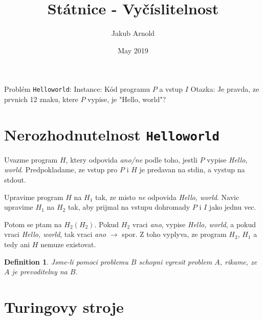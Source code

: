 \documentclass{article}
\title{Státnice - Vyčíslitelnost}
\author{Jakub Arnold}
\date{May 2019}
\newcommand{\inlinecode}{\texttt}
\theoremstyle{plain}
\theoremstyle{plain}
\newtheorem{defn}{Definition}
\theoremstyle{remark}
\begin{document}
\maketitle

Problém \inlinecode{Helloworld}:
Instance: Kód programu $P$ a vstup $I$
Otazka: Je pravda, ze prvnich 12 znaku, ktere $P$ vypise, je "Hello, world"?

\section{Nerozhodnutelnost \inlinecode{Helloworld}}

Uvazme program $H$, ktery odpovida \emph{ano/ne} podle toho, jestli $P$ vypise \emph{Hello, world}. Predpokladame, ze vstup pro $P$ i $H$ je predavan na stdin, a vystup na stdout.

Upravime program $H$ na $H_1$ tak, ze misto \emph{ne} odpovida \emph{Hello, world}. Navic upravime $H_1$ na $H_2$ tak, aby prijmal na vstupu dohromady $P$ i $I$ jako jednu vec.

Potom se ptam na $H_2(H_2)$. Pokud $H_2$ vraci \emph{ano}, vypise \emph{Hello, world}, a pokud vraci \emph{Hello, world}, tak vraci \emph{ano} $\rightarrow$ spor. Z toho vyplyva, ze program $H_2$, $H_1$ a tedy ani $H$ nemuze existovat.


\begin{defn}
    Jsme-li pomoci problemu $B$ schopni vyresit problem $A$, rikame, ze $A$ je \emph{prevoditelny} na $B$.
\end{defn}







\section{Turingovy stroje}
\end{document}
